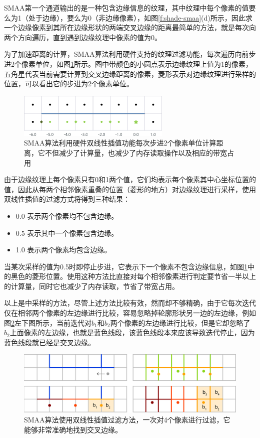 SMAA第一个通道输出的是一种包含边缘信息的纹理，其中纹理中每个像素的值要么为1（处于边缘），要么为0（非边缘像素），如图\ref{f:shade-smaa}(d)所示，因此求一个边缘像素到其所在边缘形状的两端交叉边缘的距离最简单的方法，就是每次向两个方向遍历，直到遇到边缘纹理中像素的值为0。

为了加速距离的计算，SMAA算法利用硬件支持的纹理过滤功能，每次遍历向前步进2个像素单位，如图\ref{f:shade-distance}所示。图中带颜色的小圆点表示边缘纹理上值为1的像素，五角星代表当前需要计算到交叉边缘距离的像素，菱形表示对边缘纹理进行采样的位置，可以看出它的步进为2个像素单位。

\begin{figure}
\sidecaption
	\includegraphics[width=0.65\textwidth]{figures/shade/distance}
	\caption{SMAA算法利用硬件双线性插值功能每次步进2个像素单位计算距离，它不但减少了计算量，也减少了内存读取操作以及相应的带宽占用}
	\label{f:shade-distance}
\end{figure}

由于边缘纹理上每个像素只有0和1两个值，它们均表示每个像素其中心坐标位置的值，因此从每两个相邻像素重叠的位置（菱形的地方）对边缘纹理进行采样，使用双线性插值的过滤方式将得到三种结果：

\begin{itemize}
	\item 0.0 表示两个像素均不包含边缘。
	\item 0.5 表示其中一个像素包含边缘。
	\item 1.0 表示两个像素均包含边缘。
\end{itemize}

当某次采样的值为0.5时即停止步进，它表示下一个像素不包含边缘信息，如图\ref{f:shade-distance}中的黑色的菱形位置。使用这种方法比直接对每个相邻像素进行判定要节省一半以上的计算量，同时它也减少了内存读取，节省了带宽占用。

以上是\cite{a:PracticalMorphologicalAnti-Aliasing}中采样的方法，尽管上述方法比较有效，然而却不够精确，由于它每次迭代仅在相邻两个像素的左边缘进行比较，容易忽略掉轮廓形状另一边的左边缘，例如图\ref{f:shade-accurate-distance}左下图所示，当前迭代对$b_1$和$b_2$两个像素的左边缘进行比较，但是它却忽略了$b_2$上面像素的左边缘，也就是蓝色线段，该蓝色线段本来应该导致迭代停止，因为蓝色线段就已经是交叉边缘。

\begin{figure}
	\includegraphics[width=1.\textwidth]{figures/shade/accurate-distance}
	\caption{SMAA算法使用双线性插值过滤方法，一次对4个像素进行过滤，它能够非常准确地找到交叉边缘。}
	\label{f:shade-accurate-distance}
\end{figure}

